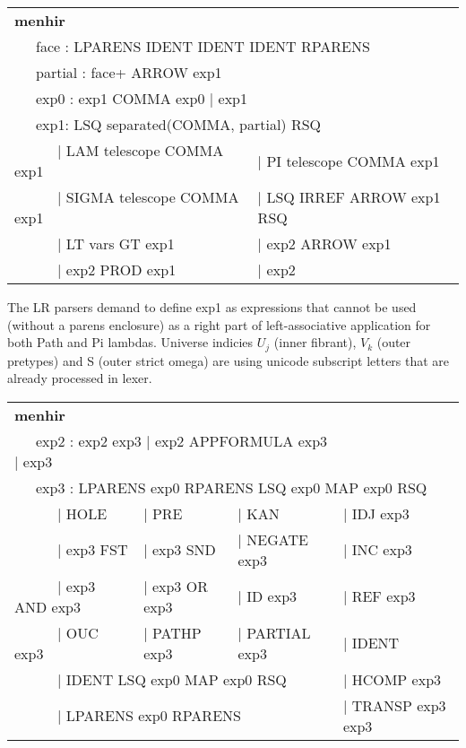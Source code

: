 \documentclass[a4paper,UKenglish,cleveref, autoref, thm-restate]{lipics-v2021}
\newcommand{\tabstyle}[0]{\scriptsize\ttfamily\fontseries{l}\selectfont}
\begin{document}
\begin{table}[ht]
\tabstyle
\begin{tabular}{ll}
\textbf{menhir} \\
\multicolumn{2}{l}{\ \ \ face : LPARENS IDENT IDENT IDENT RPARENS } \\
\multicolumn{2}{l}{\ \ \ partial : face+ ARROW exp1 } \\
\multicolumn{2}{l}{\ \ \ exp0 : exp1 COMMA exp0 | exp1 } \\
\multicolumn{2}{l}{\ \ \ exp1: LSQ separated(COMMA, partial) RSQ } \\
\ \ \ \ \ \ | LAM telescope COMMA exp1   & | PI telescope COMMA exp1 \\
\ \ \ \ \ \ | SIGMA telescope COMMA exp1 & | LSQ IRREF ARROW exp1 RSQ \\
\ \ \ \ \ \ | LT vars GT exp1            & | exp2 ARROW exp1 \\
\ \ \ \ \ \ | exp2 PROD exp1             & | exp2 \\
\end{tabular}
\end{table}

The LR parsers demand to define exp1 as expressions that cannot be used (without a parens enclosure) as a right part of left-associative application for both Path and Pi lambdas.
Universe indicies $U_j$ (inner fibrant), $V_k$ (outer pretypes) and S (outer strict omega) are using unicode subscript letters that are already processed in lexer.

\begin{table}[ht!]
\tabstyle
\begin{tabular}{llll}
\textbf{menhir} \\
\multicolumn{3}{l}{\ \ \ exp2 : exp2 exp3 | exp2 APPFORMULA exp3 | exp3 } \\
\multicolumn{4}{l}{\ \ \ exp3 : LPARENS exp0 RPARENS LSQ exp0 MAP exp0 RSQ } \\
\ \ \ \ \ \   | HOLE              & | PRE          & | KAN          & | IDJ exp3 \\
\ \ \ \ \ \   | exp3 FST          & | exp3 SND     & | NEGATE exp3  & | INC exp3 \\
\ \ \ \ \ \   | exp3 AND exp3     & | exp3 OR exp3 & | ID exp3      & | REF exp3\\
\ \ \ \ \ \   | OUC exp3          & | PATHP exp3   & | PARTIAL exp3 & | IDENT \\
\multicolumn{3}{l}{\ \ \ \ \ \    | IDENT LSQ exp0 MAP exp0 RSQ }   & | HCOMP exp3 \\
\multicolumn{3}{l}{\ \ \ \ \ \    | LPARENS exp0 RPARENS }          & | TRANSP exp3 exp3 \\
\end{tabular}
\end{table}
\end{document}
